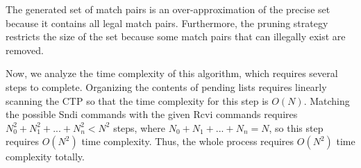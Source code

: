 The generated set of match pairs is an over-approximation of the precise set because it contains all legal match pairs. Furthermore, the pruning strategy restricts the size of the set because some match pairs that can illegally exist are removed.

Now, we analyze the time complexity of this algorithm, which requires several steps to complete. Organizing the contents of pending lists requires linearly scanning the CTP so that the time complexity for this step is $O(N)$. Matching the possible Sndi commands with the given Rcvi commands requires $N_0^2 + N_1^2 + ... + N_n^2 < N^2$ steps, where $N_0 + N_1 + ... + N_n = N$, so this step requires $O(N^2)$ time complexity. Thus, the whole process requires $O(N^2)$ time complexity totally. %

